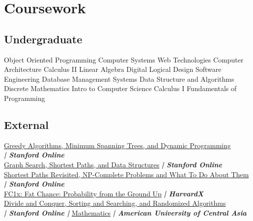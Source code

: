 \documentclass[]{deedy-resume-openfont}
\begin{document}
\begin{minipage}[t]{0.59\textwidth}
\begin{tightemize}
\end{tightemize}




\section{Coursework}
\subsection{Undergraduate}
Object Oriented Programming\textbullet{}
Computer Systems \textbullet{}
Web Technologies \textbullet{}
Computer Architecture \textbullet{}
Calculus II \textbullet{}
Linear Algebra \textbullet{}
Digital Logical Design\textbullet{}
Software Engineering \textbullet{}
Database Management Systems \textbullet{}
Data Structure and Algorithms \textbullet{}
Discrete Mathematics \textbullet{}
Intro to Computer Science \textbullet{}
Calculus I \textbullet{}
Fundamentals of Programming 
\sectionsep


\subsection{External}



\href{https://www.coursera.org/account/accomplishments/verify/BBJ82ES293NF}{Greedy Algorithms, Minimum Spanning Trees, and
Dynamic Programming}\\
{\footnotesize \textit{\textbf{| Stanford Online}}}\\
\href{https://www.coursera.org/account/accomplishments/verify/8Y6GMJJ42MUR}{Graph Search, Shortest Paths, and Data Structures}{\footnotesize \textit{\textbf{ | Stanford Online}}} \\
\href{https://www.coursera.org/account/accomplishments/verify/4HBNSGEQ6TZ4}{Shortest Paths Revisited, NP-Complete Problems
and What To Do About Them}
{\footnotesize \textit{\textbf{| Stanford Online}}} \\
\href{https://courses.edx.org/certificates/b280feb4fda94cd4be068e32d2c15270}{FC1x: Fat Chance: Probability from the Ground Up}
{\footnotesize \textit{\textbf{ | HarvardX}}} \\

\href{https://www.coursera.org/account/accomplishments/verify/9NLW95QA5L65}{Divide and Conquer, Sorting and Searching, and Randomized Algorithms} \\
{\footnotesize \textit{\textbf{| Stanford Online |  \space \space \space  \space \space \space \space \space \space   }}} 
\href{https://auca.kg/en/cec_preparatorycourses/66/}{Mathematics}
{\footnotesize \textit{\textbf{| American University of Central Asia}}} \\


\end{minipage}
\end{document}
